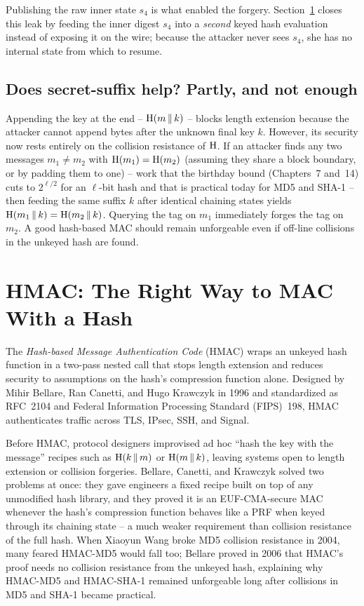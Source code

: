 Publishing the raw inner state $s_4$ is what enabled the forgery. Section~\ref{ch15:hmac} closes this leak by feeding the inner digest $s_4$ into a \emph{second} keyed hash evaluation instead of exposing it on the wire; because the attacker never sees $s_4$, she has no internal state from which to resume.

\subsection{Does secret-suffix help? Partly, and not enough}

Appending the key at the end -- $\operatorname{H}(m\,\|\, k)$ -- blocks length extension because the attacker cannot append bytes after the unknown final key $k$. However, its security now rests entirely on the collision resistance of $\operatorname{H}$. If an attacker finds any two messages $m_1\ne m_2$ with $\operatorname{H}(m_1)=\operatorname{H}(m_2)$ (assuming they share a block boundary, or by padding them to one) -- work that the birthday bound (Chapters~7 and~14) cuts to $2^{\ell/2}$ for an $\ell$-bit hash and that is practical today for MD5 and SHA-1 -- then feeding the same suffix $k$ after identical chaining states yields $\operatorname{H}(m_1\,\|\, k)=\operatorname{H}(m_2\,\|\, k)$. Querying the tag on $m_1$ immediately forges the tag on $m_2$. A good hash-based MAC should remain unforgeable even if off-line collisions in the unkeyed hash are found.

\section{HMAC: The Right Way to MAC With a Hash}
\label{ch15:hmac}

The \emph{Hash-based Message Authentication Code} (HMAC) wraps an unkeyed hash function in a two-pass nested call that stops length extension and reduces security to assumptions on the hash's compression function alone. Designed by Mihir Bellare, Ran Canetti, and Hugo Krawczyk in 1996 and standardized as RFC~2104 and Federal Information Processing Standard (FIPS)~198, HMAC authenticates traffic across TLS, IPsec, SSH, and Signal.

\begin{historybox}
Before HMAC, protocol designers improvised ad hoc ``hash the key with the message'' recipes such as $\operatorname{H}(k \,\|\, m)$ or $\operatorname{H}(m \,\|\, k)$, leaving systems open to length extension or collision forgeries. Bellare, Canetti, and Krawczyk solved two problems at once: they gave engineers a fixed recipe built on top of any unmodified hash library, and they proved it is an EUF-CMA-secure MAC whenever the hash's compression function behaves like a PRF when keyed through its chaining state -- a much weaker requirement than collision resistance of the full hash. When Xiaoyun Wang broke MD5 collision resistance in 2004, many feared HMAC-MD5 would fall too; Bellare proved in 2006 that HMAC's proof needs no collision resistance from the unkeyed hash, explaining why HMAC-MD5 and HMAC-SHA-1 remained unforgeable long after collisions in MD5 and SHA-1 became practical.
\end{historybox}

